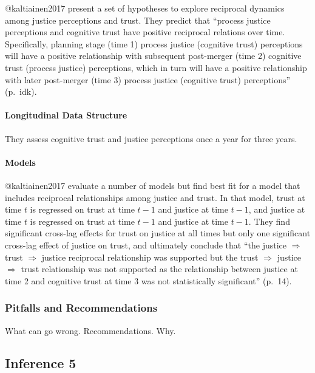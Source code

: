 \documentclass[]{article}
\let\oldparagraph\paragraph
\renewcommand{\paragraph}[1]{\oldparagraph{#1}\mbox{}}
\begin{document}
@kaltiainen2017 present a set of hypotheses to explore reciprocal
dynamics among justice perceptions and trust. They predict that
``process justice perceptions and cognitive trust have positive
reciprocal relations over time. Specifically, planning stage (time 1)
process justice (cognitive trust) perceptions will have a positive
relationship with subsequent post-merger (time 2) cognitive trust
(process justice) perceptions, which in turn will have a positive
relationship with later post-merger (time 3) process justice (cognitive
trust) perceptions'' (p.~idk).

\hypertarget{longitudinal-data-structure-6}{%
\paragraph{Longitudinal Data
Structure}\label{longitudinal-data-structure-6}}

They assess cognitive trust and justice perceptions once a year for
three years.

\hypertarget{models-10}{%
\paragraph{Models}\label{models-10}}

@kaltiainen2017 evaluate a number of models but find best fit for a
model that includes reciprocal relationships among justice and trust. In
that model, trust at time \(t\) is regressed on trust at time \(t-1\)
and justice at time \(t-1\), and justice at time \(t\) is regressed on
trust at time \(t-1\) and justice at time \(t-1\). They find significant
cross-lag effects for trust on justice at all times but only one
significant cross-lag effect of justice on trust, and ultimately
conclude that ``the justice \({\Rightarrow}\) trust \({\Rightarrow}\)
justice reciprocal relationship was supported but the trust
\({\Rightarrow}\) justice \({\Rightarrow}\) trust relationship was not
supported as the relationship between justice at time 2 and cognitive
trust at time 3 was not statistically significant'' (p.~14).

\hypertarget{pitfalls-and-recommendations-10}{%
\subsubsection{Pitfalls and
Recommendations}\label{pitfalls-and-recommendations-10}}

What can go wrong. Recommendations. Why.

\hypertarget{inference-5-1}{%
\subsection{Inference 5}\label{inference-5-1}}
\end{document}
